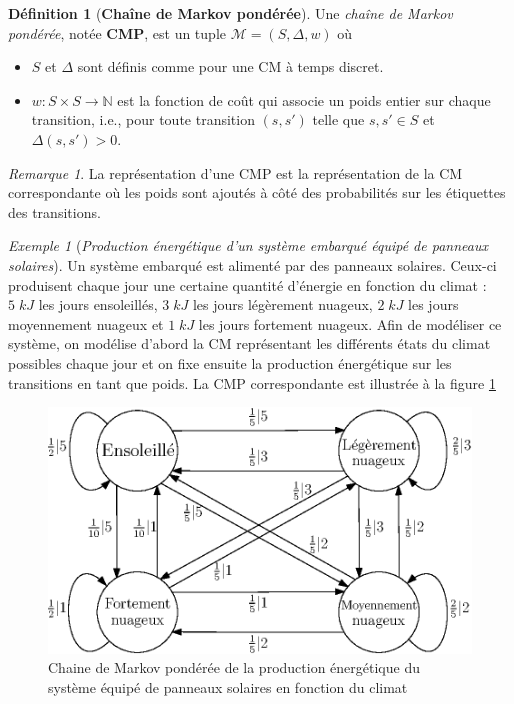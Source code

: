 \documentclass[12pt,a4paper]{report}
\theoremstyle{definition}%
\newtheorem{definition}{Définition}[chapter]
\theoremstyle{remark}
\newtheorem{example}{Exemple}[chapter]
\newtheorem{remark}{Remarque}[chapter]
\newcommand{\ie}{i.e., }
\let\labelitemi\labelitemii
\begin{document}
\begin{definition}[\textbf{Chaîne de Markov pondérée}]
	Une \textit{chaîne de Markov pondérée}, notée \textbf{CMP}, est un tuple $\mathcal{M} = (S, \Delta, w)$ où
	\begin{itemize}
		\renewcommand{\labelitemi}{\tiny$\bullet$}
		\item $S$ et $\Delta$ sont définis comme pour une CM à temps discret.
		\item $w: S\times S \rightarrow \mathbb{N}$ est la fonction de coût qui associe un poids entier sur chaque  transition, \ie pour toute transition $(s, s')$ telle que $s, s' \in S$ et $\Delta(s, s') > 0$.
	\end{itemize}
\end{definition}

\begin{remark}
	La représentation d'une CMP est la représentation de la CM correspondante où les poids sont ajoutés à côté des probabilités sur les étiquettes des transitions.
\end{remark}
\begin{example}[\textit{Production énergétique d'un système embarqué équipé de panneaux solaires}]\label{solar-pannel-example}
	Un système embarqué est alimenté par des panneaux solaires. Ceux-ci produisent chaque jour une certaine quantité d'énergie en fonction du climat : $5\; kJ$ les jours ensoleillés, $3\; kJ$ les jours légèrement nuageux, $2\; kJ$ les jours moyennement nuageux et $1\; kJ$ les jours fortement nuageux. Afin de modéliser ce système, on modélise d'abord la CM représentant les différents états du climat possibles chaque jour et on fixe ensuite la production énergétique sur les transitions en tant que poids. La CMP correspondante est illustrée à la figure \ref{solar-pannel-1}

	\begin{figure}[H]
		\centering
		\includegraphics[scale=0.9]{figures/weather-solar-pannel.eps}
		\caption{Chaine de Markov pondérée de la production énergétique du système équipé de panneaux solaires en fonction du climat}
		\label{solar-pannel-1}
	\end{figure}
\end{example}
\end{document}
